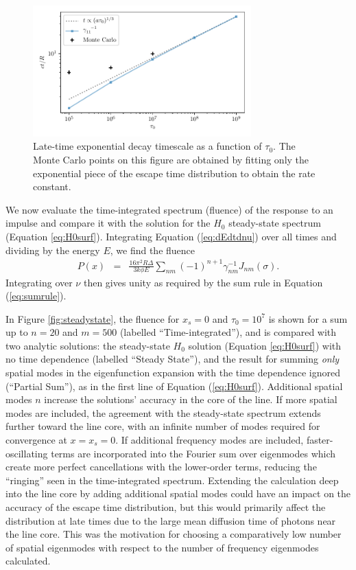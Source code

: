 \documentclass[linenumbers]{aastex63}
\newcommand{\be}{\begin{eqnarray}}
\newcommand{\ee}{\end{eqnarray}}
\begin{document}
\begin{figure}
    \centering
    \includegraphics[width=0.75\textwidth]{tau_scaling.pdf}
    \caption{Late-time exponential decay timescale as a function of $\tau_0$. The Monte Carlo points on this figure are obtained by fitting only the exponential piece of the escape time distribution to obtain the rate constant.}
    \label{fig:tau_scaling}
\end{figure}

We now evaluate the time-integrated spectrum (fluence) of the response to an impulse and compare it with the solution for the $H_0$ steady-state spectrum (Equation \ref{eq:H0surf}). Integrating Equation (\ref{eq:dEdtdnu}) over all times and dividing by the energy $E$, we find the fluence
\be \label{eq:spectrum}
P(x) & = &  \frac{16\pi^2 R \Delta}{3k\phi E}  \sum_{nm} (-1)^{n+1} \gamma_{nm}^{-1} J_{nm}(\sigma).
\ee
Integrating over $\nu$ then gives unity as required by the sum rule in Equation (\ref{eq:sumrule}). 

In Figure \ref{fig:steadystate}, the fluence for $x_s=0$ and $\tau_0=10^7$ is shown for a sum up to $n=20$ and $m=500$ (labelled ``Time-integrated''), and is compared with two analytic solutions: the steady-state $H_0$ solution (Equation \ref{eq:H0surf}) with no time dependence (labelled ``Steady State''), and the result for summing \textit{only} spatial modes in the eigenfunction expansion with the time dependence ignored (``Partial Sum''), as in the first line of Equation (\ref{eq:H0surf}). Additional spatial modes $n$ increase the solutions' accuracy in the core of the line. If more spatial modes are included, the agreement with the steady-state spectrum extends further toward the line core, with an infinite number of modes required for convergence at $x=x_s=0$. If additional frequency modes are included, faster-oscillating terms are incorporated into the Fourier sum over eigenmodes which create more perfect cancellations with the lower-order terms, reducing the ``ringing'' seen in the time-integrated spectrum. Extending the calculation deep into the line core by adding additional spatial modes could have an impact on the accuracy of the escape time distribution, but this would primarily affect the distribution at late times due to the large mean diffusion time of photons near the line core. This was the motivation for choosing a comparatively low number of spatial eigenmodes with respect to the number of frequency eigenmodes calculated.
\end{document}
